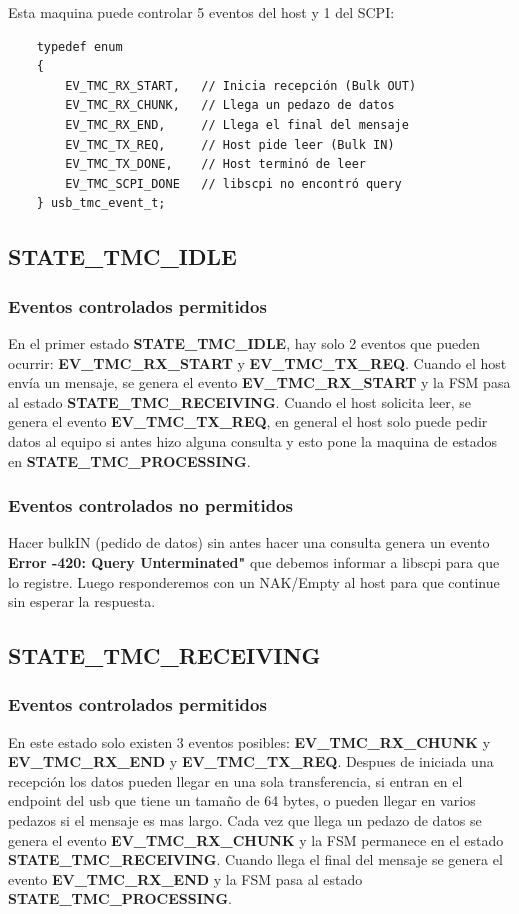 Esta maquina puede controlar 5 eventos del host y 1 del SCPI:
\begin{verbatim}
    typedef enum
    {
        EV_TMC_RX_START,   // Inicia recepción (Bulk OUT)
        EV_TMC_RX_CHUNK,   // Llega un pedazo de datos
        EV_TMC_RX_END,     // Llega el final del mensaje
        EV_TMC_TX_REQ,     // Host pide leer (Bulk IN)
        EV_TMC_TX_DONE,    // Host terminó de leer
        EV_TMC_SCPI_DONE   // libscpi no encontró query
    } usb_tmc_event_t;
\end{verbatim}

\subsection{STATE\_TMC\_IDLE}
\subsubsection*{Eventos controlados permitidos}
En el primer estado \textbf{STATE\_TMC\_IDLE}, hay solo 2 eventos que pueden ocurrir: \textbf{EV\_TMC\_RX\_START} y \textbf{EV\_TMC\_TX\_REQ}. 
Cuando el host envía un mensaje, se genera el evento \textbf{EV\_TMC\_RX\_START} y la FSM pasa al estado \textbf{STATE\_TMC\_RECEIVING}. 
Cuando el host solicita leer, se genera el evento \textbf{EV\_TMC\_TX\_REQ}, en general el host solo puede pedir datos al equipo si antes hizo alguna consulta y esto pone la maquina de estados en \textbf{STATE\_TMC\_PROCESSING}.

\subsubsection*{Eventos controlados no permitidos}
Hacer bulkIN (pedido de datos) sin antes hacer una consulta genera un evento \textbf{Error -420: Query Unterminated"} que debemos informar a libscpi para que lo registre. Luego responderemos con un NAK/Empty al host para que continue sin esperar la respuesta.

\subsection{STATE\_TMC\_RECEIVING}
\subsubsection*{Eventos controlados permitidos}
En este estado solo existen 3 eventos posibles: \textbf{EV\_TMC\_RX\_CHUNK} y \textbf{EV\_TMC\_RX\_END} y \textbf{EV\_TMC\_TX\_REQ}.
Despues de iniciada una recepción los datos pueden llegar en una sola transferencia, si entran en el endpoint del usb que tiene un tamaño de 64 bytes, o pueden llegar en varios pedazos si el mensaje es mas largo. 
Cada vez que llega un pedazo de datos se genera el evento \textbf{EV\_TMC\_RX\_CHUNK} y la FSM permanece en el estado \textbf{STATE\_TMC\_RECEIVING}. 
Cuando llega el final del mensaje se genera el evento \textbf{EV\_TMC\_RX\_END} y la FSM pasa al estado \textbf{STATE\_TMC\_PROCESSING}.

